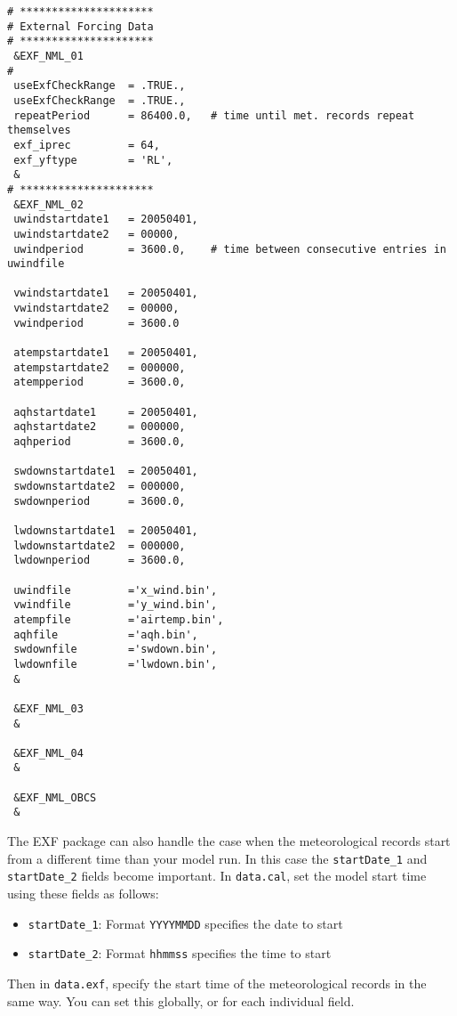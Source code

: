 \documentclass[11pt]{article}
\begin{document}
\begin{lstlisting}[caption={Sample \texttt{data.exf} file. This instance has meteorological records every $\SI{3600}{s}$ ($\SI{1}{h}$), and the forcing is repeated every day.}, label={listing:data.exf}]
# *********************
# External Forcing Data
# *********************
 &EXF_NML_01
#
 useExfCheckRange  = .TRUE.,
 useExfCheckRange  = .TRUE.,
 repeatPeriod      = 86400.0,	# time until met. records repeat themselves
 exf_iprec         = 64,
 exf_yftype        = 'RL',
 &
# *********************
 &EXF_NML_02
 uwindstartdate1   = 20050401,
 uwindstartdate2   = 00000,
 uwindperiod       = 3600.0,	# time between consecutive entries in uwindfile

 vwindstartdate1   = 20050401,
 vwindstartdate2   = 00000,
 vwindperiod       = 3600.0

 atempstartdate1   = 20050401,
 atempstartdate2   = 000000,
 atempperiod       = 3600.0,

 aqhstartdate1     = 20050401,
 aqhstartdate2     = 000000,
 aqhperiod         = 3600.0,

 swdownstartdate1  = 20050401,
 swdownstartdate2  = 000000,
 swdownperiod      = 3600.0,

 lwdownstartdate1  = 20050401,
 lwdownstartdate2  = 000000,
 lwdownperiod      = 3600.0,

 uwindfile         ='x_wind.bin',
 vwindfile         ='y_wind.bin',
 atempfile         ='airtemp.bin',
 aqhfile           ='aqh.bin',
 swdownfile        ='swdown.bin',
 lwdownfile        ='lwdown.bin',
 &

 &EXF_NML_03
 &

 &EXF_NML_04
 &

 &EXF_NML_OBCS
 &
\end{lstlisting}

The EXF package can also handle the case when the meteorological records start from a different time than your model run. In this case the \verb|startDate_1| and \verb|startDate_2| fields become important. In \verb|data.cal|, set the model start time using these fields as follows:
\begin{itemize}
\item{\verb|startDate_1|: Format \verb|YYYYMMDD| specifies the date to start}
\item{\verb|startDate_2|: Format \verb|hhmmss| specifies the time to start}
\end{itemize}
Then in \verb|data.exf|, specify the start time of the meteorological records in the same way. You can set this globally, or for each individual field.
\end{document}
